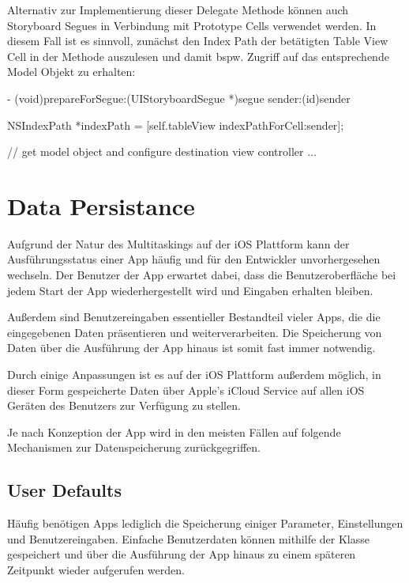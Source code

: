 \documentclass[parskip=half, final]{scrreprt}
\begin{document}
Alternativ zur Implementierung dieser Delegate Methode können auch Storyboard Segues in Verbindung mit Prototype Cells verwendet werden. In diesem Fall ist es sinnvoll, zunächst den Index Path der betätigten Table View Cell in der  Methode auszulesen und damit bspw. Zugriff auf das entsprechende Model Objekt zu erhalten:

\begin{objclst}
- (void)prepareForSegue:(UIStoryboardSegue *)segue sender:(id)sender {

    NSIndexPath *indexPath = [self.tableView indexPathForCell:sender];

    // get model object and configure destination view controller ...

}
\end{objclst}


\section{Data Persistance}

Aufgrund der Natur des Multitaskings auf der iOS Plattform kann der Ausführungsstatus einer App  häufig und für den Entwickler unvorhergesehen wechseln. Der Benutzer der App erwartet dabei, dass die Benutzeroberfläche bei jedem Start der App wiederhergestellt wird und Eingaben erhalten bleiben.

Außerdem sind Benutzereingaben essentieller Bestandteil vieler Apps, die die eingegebenen Daten präsentieren und weiterverarbeiten. Die Speicherung von Daten über die Ausführung der App hinaus ist somit fast immer notwendig.

Durch einige Anpassungen ist es auf der iOS Plattform außerdem möglich, in dieser Form gespeicherte Daten über Apple's iCloud Service auf allen iOS Geräten des Benutzers zur Verfügung zu stellen.

Je nach Konzeption der App wird in den meisten Fällen auf folgende Mechanismen zur Datenspeicherung zurückgegriffen.

\subsection{User Defaults}\label{sec:userdefaults}

Häufig benötigen Apps lediglich die Speicherung einiger Parameter, Einstellungen und Benutzereingaben. Einfache Benutzerdaten können mithilfe der  Klasse gespeichert und über die Ausführung der App hinaus zu einem späteren Zeitpunkt wieder aufgerufen werden.
\end{document}
